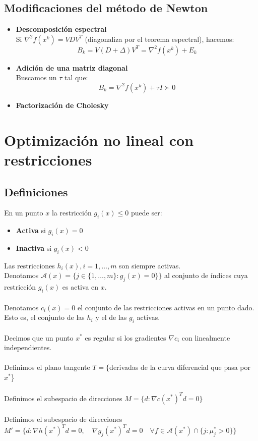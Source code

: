 \documentclass{myclass}
\newcommand{\N}{\nabla}
\begin{document}
\subsection{Modificaciones del método de Newton}
\begin{itemize}
    \item \textbf{Descomposición espectral} \\
    Si $\N^2f(x^k) = VDV^T$ (diagonaliza por el teorema espectral), hacemos:
    $$
    B_k = V(D + \Delta) V^T = \N^2f(x^k) + E_k
    $$
    \item \textbf{Adición de una matriz diagonal}\\
    Buscamos un $\tau$ tal que:
    $$
    B_k = \N^2 f(x^k) + \tau I \succ 0
    $$
    \item \textbf{Factorización de Cholesky}
    
\end{itemize}

\section{Optimización no lineal con restricciones}
\subsection{Definiciones}
En un punto $x$ la restricción $g_i(x)\leq 0$ puede ser:
\begin{itemize}
    \item \textbf{Activa} si $g_i(x)=0$
    \item \textbf{Inactiva} si $g_i(x)<0$
\end{itemize}
Las restricciones $h_i(x), i=1, \ldots, m$ son siempre activas.\\
Denotamos $\mathcal{A}(x) = \{j\in \{1, \ldots, m\} : g_j(x)=0\}\}$ al conjunto de índices cuya restricción $g_i(x)$ es activa en $x$.\\
\\
Denotamos $c_i(x)=0$ el conjunto de las restricciones activas en un punto dado. Esto es, el conjunto de las $h_i$ y el de las $g_i$ activas. \\
\\
Decimos que un punto $x^*$ es regular si los gradientes $\nabla c_i$ con linealmente independientes.\\
\\
Definimos el plano tangente $T = \{$derivadas de la curva diferencial que pasa por $x^*$\} \\
\\
Definimos el subespacio de direcciones $M = \{d:\nabla c(x^*)^Td = 0\}$\\
\\
Definimos el subespacio de direcciones $M' = \{d:\nabla h(x^*)^Td = 0, \quad \nabla g_j(x^*)^Td = 0 \quad \forall f\in \mathcal{A}(x^*)\cap \{j: \mu_j^* > 0\} \}$
\end{document}
